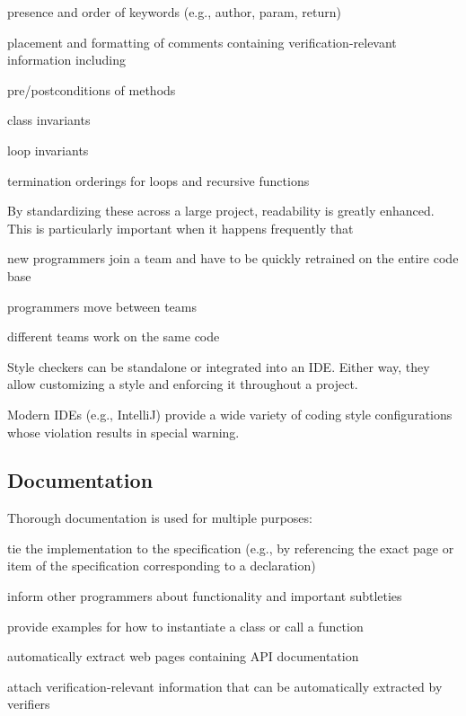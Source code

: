 \begin{compactitem}
\begin{compactitem}
     \item presence and order of keywords (e.g., author, param, return)
   \end{compactitem}
   \item placement and formatting of comments containing verification-relevant information including
   \begin{compactitem}
     \item pre/postconditions of methods
     \item class invariants
     \item loop invariants
     \item termination orderings for loops and recursive functions
   \end{compactitem}
\end{compactitem}
  
By standardizing these across a large project, readability is greatly enhanced.
This is particularly important when it happens frequently that
\begin{compactitem}
 \item new programmers join a team and have to be quickly retrained on the entire code base
 \item programmers move between teams
 \item different teams work on the same code
\end{compactitem}

Style checkers can be standalone or integrated into an IDE.
Either way, they allow customizing a style and enforcing it throughout a project.

Modern IDEs (e.g., IntelliJ) provide a wide variety of coding style configurations whose violation results in special warning.
  
\subsection{Documentation}

Thorough documentation is used for multiple purposes:
\begin{compactitem}
 \item tie the implementation to the specification (e.g., by referencing the exact page or item of the specification corresponding to a declaration)
 \item inform other programmers about functionality and important subtleties
 \item provide examples for how to instantiate a class or call a function
 \item automatically extract web pages containing API documentation
 \item attach verification-relevant information that can be automatically extracted by verifiers
\end{compactitem}

